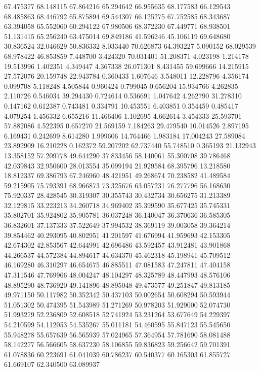67.475377
68.148115
67.864216
65.294642
66.955635
68.177583
66.129543
68.485863
68.446792
65.875894
69.544307
66.125275
67.752585
68.343687
63.394058
65.552060
60.294122
67.980506
68.372230
67.449771
68.938501
51.131415
65.256240
63.475014
69.849186
41.596246
45.106119
69.648680
30.836524
32.046629
50.836332
8.033440
70.626873
64.393227
5.090152
68.029539
68.978422
46.853859
7.448700
3.424320
70.031401
51.208371
4.023198
1.214178
19.513996
1.402351
4.349447
4.367338
26.071301
8.431455
59.699666
14.215915
27.572076
20.159748
22.943784
0.360433
1.607646
3.548011
12.228796
4.356174
0.099708
5.118248
4.505844
0.960424
0.799045
0.656204
15.934766
4.262835
2.110726
0.546034
39.294430
0.724614
0.536691
1.047642
4.262790
31.278310
0.147162
0.612387
0.743481
0.334791
10.453551
6.403851
0.354459
0.485417
4.079254
1.456332
6.655216
11.466406
1.102695
4.662614
3.454333
25.593701
57.882086
4.522395
0.657270
21.569159
7.184263
29.479540
10.014526
2.897195
6.169431
0.242699
8.614280
1.999606
14.764466
1.983184
17.004243
27.589084
23.892909
16.210228
0.162372
59.207202
62.737440
55.748510
0.365193
21.132943
13.358152
57.209778
49.644290
37.833456
58.140061
55.300708
39.786468
42.039843
32.950600
28.013554
35.099194
21.929584
68.395796
13.218580
18.812337
69.386793
67.246960
48.421951
49.268674
70.238582
41.489584
59.215905
75.793391
68.966873
73.325676
63.057231
76.277796
56.168630
75.920337
28.428545
30.319307
30.355743
30.432734
30.656275
31.213389
32.129815
33.223213
34.260718
34.969402
35.399590
35.677425
35.745331
35.802701
35.924802
35.905781
36.037248
36.140047
36.370636
36.585305
36.832601
37.137333
37.522649
37.994532
38.369119
39.003058
39.364214
39.854462
40.293095
40.802951
41.201597
41.676994
41.959693
42.153305
42.674302
42.853567
42.644991
42.696486
43.592457
43.912481
43.901868
44.266537
44.572384
44.894617
44.634370
45.462318
45.198941
45.709512
46.169280
46.310297
46.654675
46.885511
47.081583
47.247811
47.404158
47.311546
47.769966
48.004247
48.104297
48.325789
48.447993
48.576106
48.895290
48.736920
49.141896
48.895048
49.473577
49.251847
49.813185
49.971150
50.117982
50.352342
50.437103
50.002654
50.608294
50.593944
51.051302
50.474395
51.543989
51.271269
50.978203
51.929000
52.074730
51.993279
52.236809
52.608518
52.741924
53.231264
53.677649
54.229397
54.210599
54.112053
54.535267
55.011181
54.460595
55.847123
55.545650
55.948278
55.657639
56.565939
57.024965
57.364954
57.781690
58.081488
58.142277
56.566605
58.637230
58.106855
59.836823
59.256642
59.701391
61.078836
60.223691
61.041039
60.786237
60.540377
60.165303
61.855727
61.669107
62.340500
63.089937

